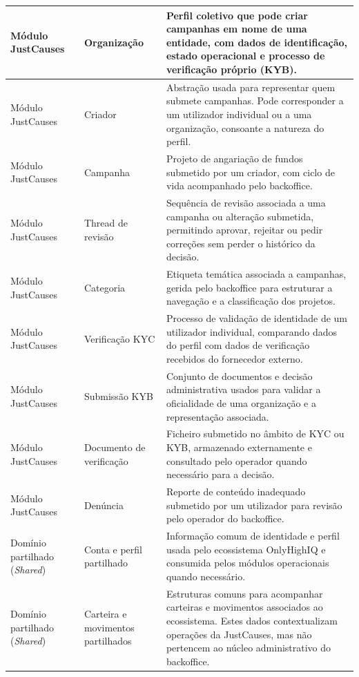 \begin{longtable}{|p{2.8cm}|p{3.2cm}|p{7cm}|}
Módulo JustCauses & Organização & Perfil coletivo que pode criar campanhas em nome de uma entidade, com dados de identificação, estado operacional e processo de verificação próprio (\gls{KYB}). \\ \hline
Módulo JustCauses & Criador & Abstração usada para representar quem submete campanhas. Pode corresponder a um utilizador individual ou a uma organização, consoante a natureza do perfil. \\ \hline
Módulo JustCauses & Campanha & Projeto de angariação de fundos submetido por um criador, com ciclo de vida acompanhado pelo backoffice. \\ \hline
Módulo JustCauses & Thread de revisão & Sequência de revisão associada a uma campanha ou alteração submetida, permitindo aprovar, rejeitar ou pedir correções sem perder o histórico da decisão. \\ \hline
Módulo JustCauses & Categoria & Etiqueta temática associada a campanhas, gerida pelo backoffice para estruturar a navegação e a classificação dos projetos. \\ \hline
Módulo JustCauses & Verificação KYC & Processo de validação de identidade de um utilizador individual, comparando dados do perfil com dados de verificação recebidos do fornecedor externo. \\ \hline
Módulo JustCauses & Submissão KYB & Conjunto de documentos e decisão administrativa usados para validar a oficialidade de uma organização e a representação associada. \\ \hline
Módulo JustCauses & Documento de verificação & Ficheiro submetido no âmbito de \gls{KYC} ou \gls{KYB}, armazenado externamente e consultado pelo operador quando necessário para a decisão. \\ \hline
Módulo JustCauses & Denúncia & Reporte de conteúdo inadequado submetido por um utilizador para revisão pelo operador do backoffice. \\ \hline
Domínio partilhado (\textit{Shared}) & Conta e perfil partilhado & Informação comum de identidade e perfil usada pelo ecossistema OnlyHighIQ e consumida pelos módulos operacionais quando necessário. \\ \hline
Domínio partilhado (\textit{Shared}) & Carteira e movimentos partilhados & Estruturas comuns para acompanhar carteiras e movimentos associados ao ecossistema. Estes dados contextualizam operações da JustCauses, mas não pertencem ao núcleo administrativo do backoffice. \\ \hline
\end{longtable}
\endgroup

